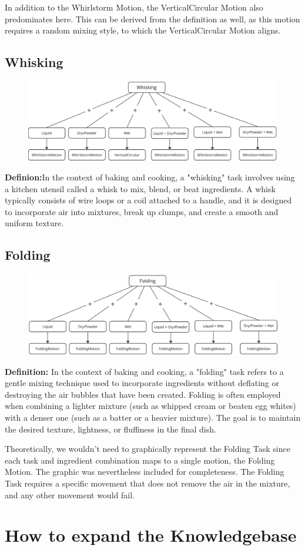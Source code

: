 In addition to the Whirlstorm Motion, the VerticalCircular Motion also predominates here. This can be derived from the definition as well, as this motion requires a random mixing style, to which the VerticalCircular Motion aligns.
\subsection{Whisking}
\begin{figure}[H]
    \includegraphics[scale=0.18]{Graphics/WhiskingDecisionTree.jpg}
    \end{figure}
\textbf{Definion:}In the context of baking and cooking, a "whisking" task involves using a kitchen utensil called a whisk to mix, blend, or beat ingredients. A whisk typically consists of wire loops or a coil attached to a handle, and it is designed to incorporate air into mixtures, break up clumps, and create a smooth and uniform texture.

\subsection{Folding}
\begin{figure}[H]
    \includegraphics[scale=0.18]{Graphics/FoldingDecisionTree.jpg}
    \end{figure}
\textbf{Definition:}
In the context of baking and cooking, a "folding" task refers to a gentle mixing technique used to incorporate ingredients without deflating or destroying the air bubbles that have been created. Folding is often employed when combining a lighter mixture (such as whipped cream or beaten egg whites) with a denser one (such as a batter or a heavier mixture). The goal is to maintain the desired texture, lightness, or fluffiness in the final dish.

Theoretically, we wouldn't need to graphically represent the Folding Task since each task and ingredient combination maps to a single motion, the Folding Motion. The graphic was nevertheless included for completeness. The Folding Task requires a specific movement that does not remove the air in the mixture, and any other movement would fail.
\section*{How to expand the Knowledgebase}